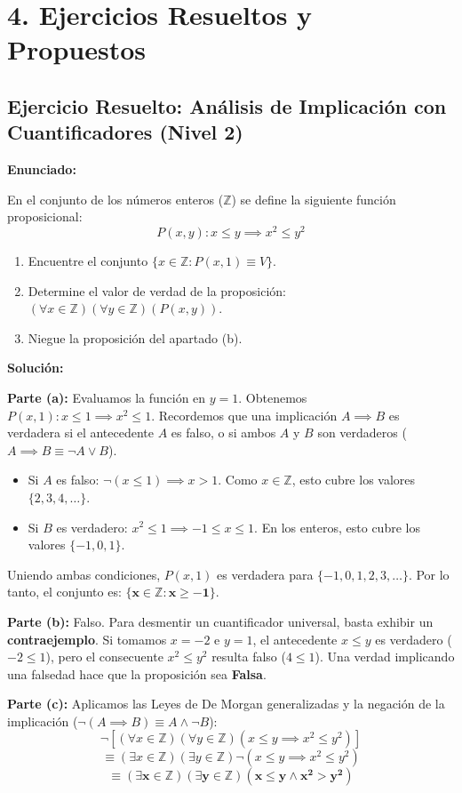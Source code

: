 \documentclass[11pt]{article}
\newenvironment{ejercicios}{\section*{4. Ejercicios Resueltos y Propuestos}}{}
\newenvironment{ejercicioresuelto}[2]{\subsection*{Ejercicio Resuelto: #1 \hfill \normalfont\small(#2)}}{ }
\newcommand{\enunciado}[1]{\textbf{Enunciado:}\par#1\par\medskip}
\newcommand{\solucion}[1]{\textbf{Solución:}\par#1\par\bigskip}
\begin{document}
\begin{ejercicios}

  \begin{ejercicioresuelto}{Análisis de Implicación con Cuantificadores}{Nivel 2}
    \enunciado{
      En el conjunto de los números enteros ($\mathbb{Z}$) se define la siguiente función proposicional:
      \[ P(x, y) : x \leq y \implies x^2 \leq y^2 \]
      \begin{enumerate}
        \item[(a)] Encuentre el conjunto $\{x \in \mathbb{Z} : P(x, 1) \equiv V\}$.
        \item[(b)] Determine el valor de verdad de la proposición: $(\forall x \in \mathbb{Z})(\forall y \in \mathbb{Z})(P(x, y))$.
        \item[(c)] Niegue la proposición del apartado (b).
      \end{enumerate}
    }
    \solucion{
      \textbf{Parte (a):} Evaluamos la función en $y=1$. Obtenemos $P(x, 1): x \leq 1 \implies x^2 \leq 1$.
      Recordemos que una implicación $A \implies B$ es verdadera si el antecedente $A$ es falso, o si ambos $A$ y $B$ son verdaderos ($A \implies B \equiv \neg A \vee B$).
      \begin{itemize}
          \item Si $A$ es falso: $\neg(x \leq 1) \implies x > 1$. Como $x \in \mathbb{Z}$, esto cubre los valores $\{2, 3, 4, \dots\}$.
          \item Si $B$ es verdadero: $x^2 \leq 1 \implies -1 \leq x \leq 1$. En los enteros, esto cubre los valores $\{-1, 0, 1\}$.
      \end{itemize}
      Uniendo ambas condiciones, $P(x,1)$ es verdadera para $\{-1, 0, 1, 2, 3, \dots\}$. 
      Por lo tanto, el conjunto es: $\mathbf{\{x \in \mathbb{Z} : x \geq -1\}}$.

      \textbf{Parte (b):} Falso. 
      Para desmentir un cuantificador universal, basta exhibir un \textbf{contraejemplo}. 
      Si tomamos $x = -2$ e $y = 1$, el antecedente $x \leq y$ es verdadero ($-2 \leq 1$), pero el consecuente $x^2 \leq y^2$ resulta falso ($4 \leq 1$). Una verdad implicando una falsedad hace que la proposición sea \textbf{Falsa}.

      \textbf{Parte (c):} Aplicamos las Leyes de De Morgan generalizadas y la negación de la implicación ($\neg(A \implies B) \equiv A \wedge \neg B$):
      \[ \neg [(\forall x \in \mathbb{Z})(\forall y \in \mathbb{Z})(x \leq y \implies x^2 \leq y^2)] \]
      \[ \equiv (\exists x \in \mathbb{Z})(\exists y \in \mathbb{Z}) \neg (x \leq y \implies x^2 \leq y^2) \]
      \[ \mathbf{\equiv (\exists x \in \mathbb{Z})(\exists y \in \mathbb{Z}) (x \leq y \wedge x^2 > y^2)} \]
    }
  \end{ejercicioresuelto}


\end{ejercicios}
\end{document}
